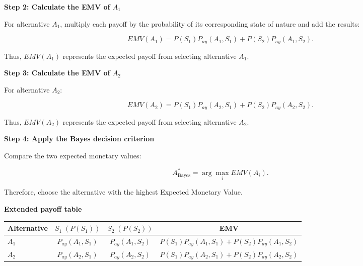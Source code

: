 	\noindent
	\setlength{\columnseprule}{0.4pt}
	
	\begin{multicols}{2}
		\vspace{0pt}
		
		
		\textbf{Step 2: Calculate the EMV of $A_1$}
		
		For alternative $A_1$, multiply each payoff by the probability of
		its corresponding state of nature and add the results:
		
		\[
		EMV(A_1)
		=
		P(S_1)P_{ay}(A_1,S_1)
		+
		P(S_2)P_{ay}(A_1,S_2).
		\]
		
		Thus, $EMV(A_1)$ represents the expected payoff from selecting
		alternative $A_1$.
		
		\columnbreak
		
		\textbf{Step 3: Calculate the EMV of $A_2$}
		
		For alternative $A_2$:
		
		\[
		EMV(A_2)
		=
		P(S_1)P_{ay}(A_2,S_1)
		+
		P(S_2)P_{ay}(A_2,S_2).
		\]
		
		Thus, $EMV(A_2)$ represents the expected payoff from selecting
		alternative $A_2$.
		
		
	\end{multicols}
	
	\setlength{\columnseprule}{0pt}
	
	\textbf{Step 4: Apply the Bayes decision criterion}
	
	Compare the two expected monetary values:
	
	$$
	A^*_{\mathrm{Bayes}}
	=
	\arg\max_i EMV(A_i).
	$$
	
	Therefore, choose the alternative with the highest Expected Monetary
	Value.
	
	
	\textbf{Extended payoff table}
	
	\begin{center}
		\small
		\renewcommand{\arraystretch}{1.5}
		\setlength{\tabcolsep}{4pt}
		
		
		\begin{tabular}{lccc}
			\toprule
			Alternative
			& $S_1\;(P(S_1))$
			& $S_2\;(P(S_2))$
			& EMV
			\\
			\midrule
			
			$A_1$
			& $P_{ay}(A_1,S_1)$
			& $P_{ay}(A_1,S_2)$
			&
			$P(S_1)P_{ay}(A_1,S_1)
			+
			P(S_2)P_{ay}(A_1,S_2)$
			\\
			
			$A_2$
			& $P_{ay}(A_2,S_1)$
			& $P_{ay}(A_2,S_2)$
			&
			$P(S_1)P_{ay}(A_2,S_1)
			+
			P(S_2)P_{ay}(A_2,S_2)$
			\\
			
			\bottomrule
		\end{tabular}
		
	\end{center}

